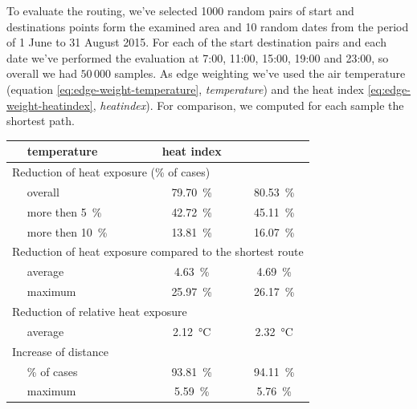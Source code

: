 To evaluate the routing, we've selected 1000 random pairs of start and destinations points form the examined  area and 10 random dates from the period of 1 June to 31 August 2015. For each of the start destination pairs and each date we've performed the evaluation at 7:00, 11:00, 15:00, 19:00 and 23:00, so overall we had $50\,000$ samples. As edge weighting we've used the air temperature (equation \eqref{eq:edge-weight-temperature}, \emph{temperature})  and the heat index \eqref{eq:edge-weight-heatindex}, \emph{heatindex}). For comparison, we computed for each sample the shortest path. 

\begin{table}
	\centering
	\begin{tabular}{llcc}
		\hline
		 & temperature & heat index \\
		 \hline
		 \multicolumn{4}{l}{Reduction of heat exposure (\% of cases) }   \\
		& overall  & \SI{79.70}{\percent} & \SI{80.53}{\percent}  \\
		& more then \SI{5}{\percent} & \SI{42.72}{\percent} & \SI{45.11}{\percent} \\
		& more then \SI{10}{\percent} & \SI{13.81}{\percent} & \SI{16.07}{\percent} \\
		 \multicolumn{4}{l}{Reduction of heat exposure compared to the shortest route}  \\
		& average  & \SI{4.63}{\percent} & \SI{4.69}{\percent}  \\
		& maximum  & \SI{25.97}{\percent} & \SI{26.17 }{\percent}  \\
		 \multicolumn{4}{l}{Reduction of relative heat exposure}  \\
		 	& average  & \SI{2.12}{\celsius} & \SI{2.32}{\celsius}  \\
		 \multicolumn{4}{l}{Increase of distance}  \\
		 & \% of cases & \SI{93.81}{\percent} & \SI{94.11}{\percent}  \\
		 & maximum  & \SI{5.59}{\percent} & \SI{5.76}{\percent}  \\
		 
		  
		 
		\hline
	\end{tabular}
\end{table}

